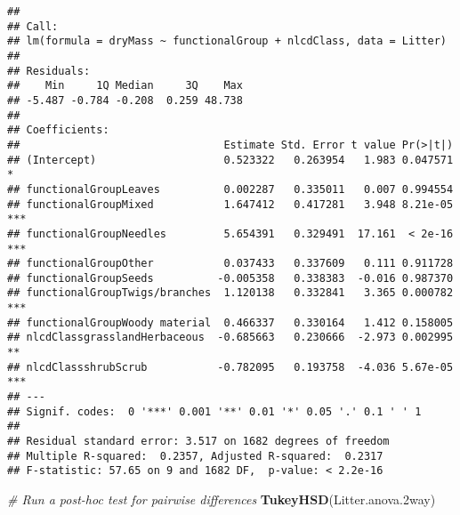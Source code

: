 \documentclass[
]{article}
\newenvironment{Shaded}{\begin{snugshade}}{\end{snugshade}}
\newcommand{\CommentTok}[1]{\textcolor[rgb]{0.56,0.35,0.01}{\textit{#1}}}
\newcommand{\FloatTok}[1]{\textcolor[rgb]{0.00,0.00,0.81}{#1}}
\newcommand{\KeywordTok}[1]{\textcolor[rgb]{0.13,0.29,0.53}{\textbf{#1}}}
\newcommand{\NormalTok}[1]{#1}
\begin{document}
\begin{verbatim}
## 
## Call:
## lm(formula = dryMass ~ functionalGroup + nlcdClass, data = Litter)
## 
## Residuals:
##    Min     1Q Median     3Q    Max 
## -5.487 -0.784 -0.208  0.259 48.738 
## 
## Coefficients:
##                                Estimate Std. Error t value Pr(>|t|)    
## (Intercept)                    0.523322   0.263954   1.983 0.047571 *  
## functionalGroupLeaves          0.002287   0.335011   0.007 0.994554    
## functionalGroupMixed           1.647412   0.417281   3.948 8.21e-05 ***
## functionalGroupNeedles         5.654391   0.329491  17.161  < 2e-16 ***
## functionalGroupOther           0.037433   0.337609   0.111 0.911728    
## functionalGroupSeeds          -0.005358   0.338383  -0.016 0.987370    
## functionalGroupTwigs/branches  1.120138   0.332841   3.365 0.000782 ***
## functionalGroupWoody material  0.466337   0.330164   1.412 0.158005    
## nlcdClassgrasslandHerbaceous  -0.685663   0.230666  -2.973 0.002995 ** 
## nlcdClassshrubScrub           -0.782095   0.193758  -4.036 5.67e-05 ***
## ---
## Signif. codes:  0 '***' 0.001 '**' 0.01 '*' 0.05 '.' 0.1 ' ' 1
## 
## Residual standard error: 3.517 on 1682 degrees of freedom
## Multiple R-squared:  0.2357, Adjusted R-squared:  0.2317 
## F-statistic: 57.65 on 9 and 1682 DF,  p-value: < 2.2e-16
\end{verbatim}

\begin{Shaded}
\begin{Highlighting}[]
\CommentTok{# Run a post-hoc test for pairwise differences}
\KeywordTok{TukeyHSD}\NormalTok{(Litter.anova}\FloatTok{.2}\NormalTok{way)}
\end{Highlighting}
\end{Shaded}
\end{document}
